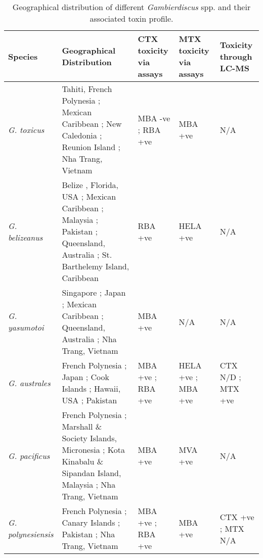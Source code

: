 	\begin{landscape}
	\begin{longtable}{ | p{2.5cm} | p{7cm} | p{3cm} | p{3cm} | p{3.5cm} | }
	\caption{Geographical distribution of different \emph{Gambierdiscus} spp. and their associated toxin profile.} \\
	\hline
	\textbf{Species} & \textbf{Geographical Distribution} & \textbf{CTX toxicity via assays} & \textbf{MTX toxicity via assays} & \textbf{Toxicity through LC-MS} \\
	\hline
	\emph{G. toxicus} & Tahiti, French Polynesia \cite{adachi1979thecal,chinain1999morphology}; Mexican Caribbean \cite{hernandez2004species}; New Caledonia \cite{chinain1999morphology}; Reunion Island \cite{chinain1999morphology}; Nha Trang, Vietnam \cite{roeder2010characteristic} & MBA -ve \cite{chinain1999morphology}; RBA +ve \cite{chinain2010growth} & MBA +ve \cite{chinain1999morphology} & N/A \\
	\hline
	\emph{G. belizeanus} & Belize \cite{faust1995observation}, Florida, USA \cite{litaker2009taxonomy}; Mexican Caribbean \cite{hernandez2004species}; Malaysia \cite{}; Pakistan \cite{munir2011occurrence}; Queensland, Australia \cite{}; St. Barthelemy Island, Caribbean \cite{litaker2010global} & RBA +ve \cite{chinain2010growth} & HELA +ve \cite{holland2013differences} & N/A \\
	\hline
	\emph{G. yasumotoi} & Singapore \cite{holmes1998gambierdiscus}; Japan \cite{nishimura2013genetic}; Mexican Caribbean \cite{hernandez2004species}; Queensland, Australia \cite{}; Nha Trang, Vietnam \cite{} & MBA +ve \cite{} & N/A & N/A \\
	\hline
	\emph{G. australes} & French Polynesia \cite{chinain1999morphology}; Japan \cite{nishimura2013genetic}; Cook Islands \cite{rhodes2010toxic}; Hawaii, USA \cite{litaker2009taxonomy}; Pakistan \cite{munir2011occurrence} & MBA +ve \cite{rhodes2010toxic}; RBA +ve \cite{chinain2010growth} & HELA +ve \cite{holland2013differences}; MBA +ve \cite{rhodes2010toxic} & CTX N/D \cite{}; MTX +ve \cite{}\\
	\hline
	\emph{G. pacificus} & French Polynesia \cite{chinain1999morphology}; Marshall \& Society Islands, Micronesia \cite{litaker2010global}; Kota Kinabalu \& Sipandan Island, Malaysia \cite{mohammad2005marine}; Nha Trang, Vietnam \cite{} & MBA +ve \cite{chinain1999morphology} & MVA +ve \cite{chinain1999morphology} & N/A \\
	\hline
	\emph{G. polynesiensis} & French Polynesia \cite{chinain1999morphology}; Canary Islands \cite{fraga2011gambierdiscus}; Pakistan \cite{munir2011occurrence}; Nha Trang, Vietnam \cite{} & MBA +ve \cite{chinain1999morphology}; RBA +ve \cite{chinain2010growth} & MBA +ve \cite{chinain1999morphology} & CTX +ve \cite{chinain2010growth}; MTX N/A \\

\end{longtable}
\end{landscape}
